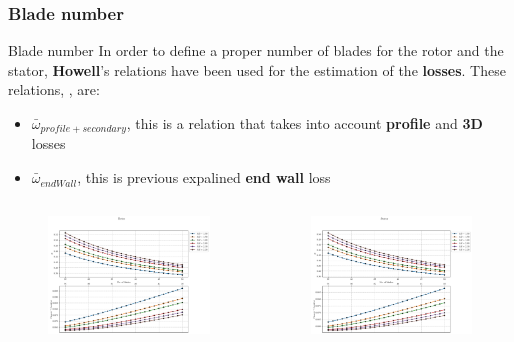 \subsubsection{Blade number}
	{\nologo
	\begin{frame}{Blade number}
		In order to define a proper number of blades for the rotor and the stator, \textbf{Howell}'s relations have been used for the estimation of the \textbf{losses}. These relations, \cite[Ch. 6]{axial2004}, are:
		\begin{itemize}
			\item $\bar{\omega}_{profile + secondary}$, this is a relation that takes into account \textbf{profile} and \textbf{3D} losses
			\item $\bar{\omega}_{endWall}$, this is previous expalined \textbf{end wall} loss
		\end{itemize}
		
		\begin{columns}
			\begin{figure}
				\centering
				\includegraphics[width=1\textwidth]{figures/rotorBlades.pdf}
			\end{figure}
			\begin{figure}
				\centering
				\includegraphics[width=1\textwidth]{figures/statorBlades.pdf}
			\end{figure}
		\end{columns}
	\end{frame}
	}
